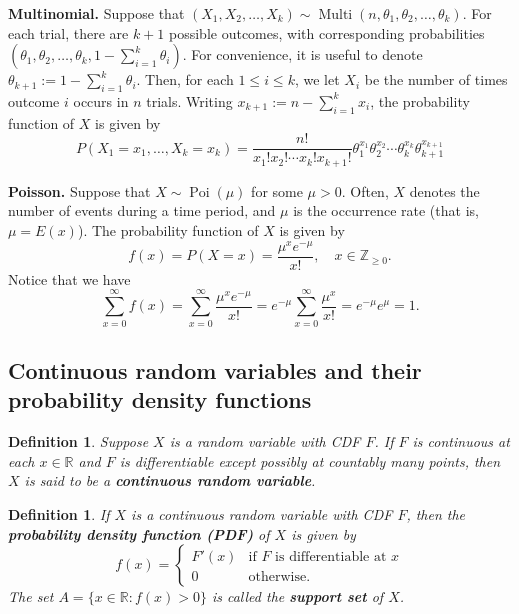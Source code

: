 \documentclass[10pt]{article}
\newcommand{\R}{\mathbb{R}}
\newcommand{\Z}{\mathbb{Z}}
\DeclareMathOperator{\Multi}{Multi}
\DeclareMathOperator{\Poi}{Poi}
\theoremstyle{newstyle}
\newtheorem{defn}[thm]{Definition}
\begin{document}
{\bf Multinomial.} Suppose that $(X_1, X_2, \dots, X_k) \sim \Multi(n, \theta_1, \theta_2, \dots, 
\theta_k)$. 
For each trial, there are $k+1$ possible outcomes, with corresponding probabilities 
$(\theta_1, \theta_2, \dots, \theta_k, 1 - \sum_{i=1}^k \theta_i)$. For convenience, it is useful to 
denote $\theta_{k+1} := 1 - \sum_{i=1}^k \theta_i$. Then, for each $1 \leq i \leq k$, we let 
$X_i$ be the number of times outcome $i$ occurs in $n$ trials. 
Writing $x_{k+1} := n - \sum_{i=1}^k x_i$, the probability function of $X$ is given by 
\[ P(X_1 = x_1, \dots, X_k = x_k) = \frac{n!}{x_1!x_2! \cdots x_k! x_{k+1}!} 
\theta_1^{x_1} \theta_2^{x_2} \cdots \theta_k^{x_k} \theta_{k+1}^{x_{k+1}} \]

{\bf Poisson.} Suppose that $X \sim \Poi(\mu)$ for some $\mu > 0$. Often, $X$ denotes the 
number of events during a time period, and $\mu$ is the occurrence rate (that is, 
$\mu = E(x)$). The probability function of $X$ is given by 
\[ f(x) = P(X = x) = \frac{\mu^x e^{-\mu}}{x!}, \quad x \in \Z_{\geq 0}. \]
Notice that we have 
\[ \sum_{x=0}^\infty f(x) = \sum_{x=0}^\infty \frac{\mu^x e^{-\mu}}{x!} = 
e^{-\mu} \sum_{x=0}^\infty \frac{\mu^x}{x!} = e^{-\mu} e^\mu = 1. \]

\subsection{Continuous random variables and their probability density functions}

\begin{defn}
Suppose $X$ is a random variable with CDF $F$. If $F$ is continuous at each $x \in \R$ and 
$F$ is differentiable except possibly at countably many points, then $X$ is said to be a 
{\bf continuous random variable}.
\end{defn}

\begin{defn}
If $X$ is a continuous random variable with CDF $F$, then the {\bf probability 
density function (PDF)} of $X$ is given by 
\[ f(x) = \begin{cases} F'(x) & \text{if $F$ is differentiable at $x$} \\ 0 & \text{otherwise.} \end{cases}
\]
The set $A = \{x \in \R : f(x) > 0\}$ is called the {\bf support set} of $X$.
\end{defn}
\end{document}
